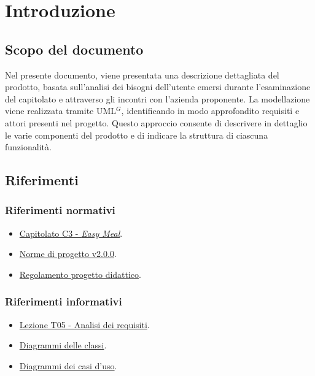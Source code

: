 \section{Introduzione}

\subsection{Scopo del documento}
Nel presente documento, viene presentata una descrizione dettagliata del prodotto, basata sull'analisi dei bisogni dell'utente 
emersi durante l'esaminazione del capitolato e attraverso gli incontri con l'azienda proponente. 
La modellazione viene realizzata tramite UML$^G$, identificando in modo approfondito requisiti e attori presenti nel progetto. 
Questo approccio consente di descrivere in dettaglio le varie componenti del prodotto e di indicare la struttura di ciascuna funzionalità.\\


\subsection{Riferimenti}
\subsubsection{Riferimenti normativi}
\begin{itemize}
    \item \href{https://www.math.unipd.it/~tullio/IS-1/2023/Progetto/C3.pdf}{Capitolato C3 - \textit{Easy Meal}}.
    \item \href{https://project-swenergy.github.io/}{Norme di progetto v2.0.0}.
    \item \href{https://www.math.unipd.it/~tullio/IS-1/2023/Dispense/PD2.pdf}{Regolamento progetto didattico}.
\end{itemize}

\subsubsection{Riferimenti informativi}
\begin{itemize}
    \item \href{https://www.math.unipd.it/~tullio/IS-1/2023/Dispense/T5.pdf}{Lezione T05 - Analisi dei requisiti}.
    \item \href{https://www.math.unipd.it/~rcardin/swea/2023/Diagrammi%20delle%20Classi.pdf}{Diagrammi delle classi}.
    \item \href{https://www.math.unipd.it/~rcardin/swea/2022/Diagrammi%20Use%20Case.pdf}{Diagrammi dei casi d'uso}.
\end{itemize}